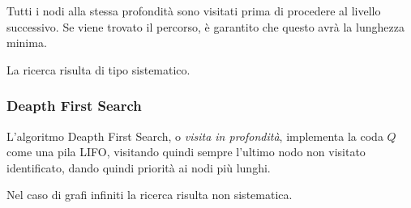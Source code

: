 \documentclass[\main/main.tex]{subfiles}
\begin{document}
Tutti i nodi alla stessa profondità sono visitati prima di procedere al livello successivo. Se viene trovato il percorso, è garantito che questo avrà la lunghezza minima.

La ricerca risulta di tipo sistematico.

\subsubsection{Deapth First Search}
L'algoritmo Deapth First Search, o \textit{visita in profondità}, implementa la coda $Q$ come una pila LIFO, visitando quindi sempre l'ultimo nodo non visitato identificato, dando quindi priorità ai nodi più lunghi.

Nel caso di grafi infiniti la ricerca risulta non sistematica.
\end{document}
